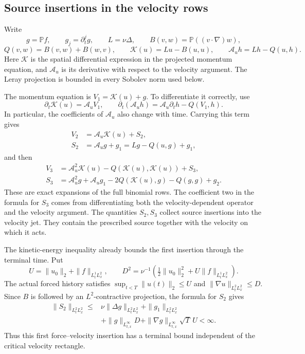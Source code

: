 \subsection{Source insertions in the velocity rows}
Write
\[
g=\mathbb Pf,\qquad g_j=\partial_t^jg,\qquad
L=\nu\Delta,\qquad
B(v,w)=\mathbb P((v\cdot\nabla)w),
\]
\[
Q(v,w)=B(v,w)+B(w,v),\qquad
\mathcal K(u)=Lu-B(u,u),\qquad
\mathcal A_u h=Lh-Q(u,h).
\]
Here \(\mathcal K\) is the spatial differential expression in the
projected momentum equation, and \(\mathcal A_u\) is its derivative
with respect to the velocity argument. The Leray projection is
bounded in every Sobolev norm used below.

The momentum equation is \(V_1=\mathcal K(u)+g\). To differentiate it correctly, use
\[
\partial_t\mathcal K(u)=\mathcal A_uV_1,\qquad
\partial_t(\mathcal A_u h)=\mathcal A_u\partial_t h-Q(V_1,h).
\]
In particular, the coefficients of \(\mathcal A_u\) also change with time. Carrying this term gives
\[
\begin{aligned}
V_2&=\mathcal A_u\mathcal K(u)+S_2,\\
S_2&=\mathcal A_u g+g_1
=Lg-Q(u,g)+g_1,
\end{aligned}
\]
and then
\[
\begin{aligned}
V_3&=\mathcal A_u^2\mathcal K(u)
     -Q(\mathcal K(u),\mathcal K(u))+S_3,\\
S_3&=\mathcal A_u^2g+\mathcal A_u g_1
     -2Q(\mathcal K(u),g)-Q(g,g)+g_2.
\end{aligned}
\]
These are exact expansions of the full binomial rows. The coefficient two in the formula for \(S_3\) comes from differentiating both the velocity-dependent operator and the velocity argument. The quantities \(S_2,S_3\) collect source insertions into the velocity jet. They contain the prescribed source together with the velocity on which it acts.

The kinetic-energy inequality already bounds the first insertion
through the terminal time. Put
\[
U=\|u_0\|_2+\|f\|_{L^1_tL^2_x},\qquad
D^2=\nu^{-1}\left(\tfrac12\|u_0\|_2^2
                      +U\|f\|_{L^1_tL^2_x}\right).
\]
The actual forced history satisfies
\(\sup_{t<T}\|u(t)\|_2\le U\) and
\(\|\nabla u\|_{L^2_tL^2_x}\le D\).
Since \(B\) is followed by an \(L^2\)-contractive projection, the formula for \(S_2\) gives
\[
\begin{aligned}
\|S_2\|_{L^2_tL^2_x}
\le{}&\nu\|\Delta g\|_{L^2_tL^2_x}
      +\|g_1\|_{L^2_tL^2_x}\\
&+\|g\|_{L^\infty_{t,x}}D
 +\|\nabla g\|_{L^\infty_{t,x}}\sqrt{T}\,U
<\infty.
\end{aligned}
\]
Thus this first force--velocity insertion has a terminal bound independent of the critical velocity rectangle.

